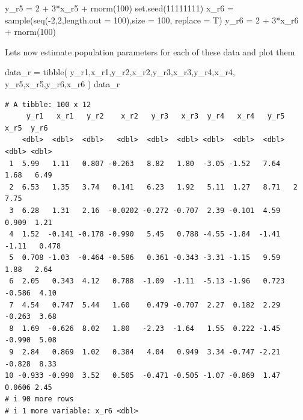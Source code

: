 \documentclass[
  letterpaper,
  DIV=11,
  numbers=noendperiod]{scrreprt}
\newenvironment{Shaded}{\begin{snugshade}}{\end{snugshade}}
\newcommand{\AttributeTok}[1]{\textcolor[rgb]{0.40,0.45,0.13}{#1}}
\newcommand{\DecValTok}[1]{\textcolor[rgb]{0.68,0.00,0.00}{#1}}
\newcommand{\FunctionTok}[1]{\textcolor[rgb]{0.28,0.35,0.67}{#1}}
\newcommand{\NormalTok}[1]{\textcolor[rgb]{0.00,0.23,0.31}{#1}}
\newcommand{\OtherTok}[1]{\textcolor[rgb]{0.00,0.23,0.31}{#1}}
\newcommand{\SpecialCharTok}[1]{\textcolor[rgb]{0.37,0.37,0.37}{#1}}
\begin{document}
\begin{Shaded}
\begin{Highlighting}[]
\NormalTok{y\_r5 }\OtherTok{=} \DecValTok{2} \SpecialCharTok{+} \DecValTok{3}\SpecialCharTok{*}\NormalTok{x\_r5 }\SpecialCharTok{+} \FunctionTok{rnorm}\NormalTok{(}\DecValTok{100}\NormalTok{)}
\FunctionTok{set.seed}\NormalTok{(}\DecValTok{11111111}\NormalTok{)}
\NormalTok{x\_r6 }\OtherTok{=} \FunctionTok{sample}\NormalTok{(}\FunctionTok{seq}\NormalTok{(}\SpecialCharTok{{-}}\DecValTok{2}\NormalTok{,}\DecValTok{2}\NormalTok{,}\AttributeTok{length.out =} \DecValTok{100}\NormalTok{),}\AttributeTok{size =} \DecValTok{100}\NormalTok{, }\AttributeTok{replace =}\NormalTok{ T)}
\NormalTok{y\_r6 }\OtherTok{=} \DecValTok{2} \SpecialCharTok{+} \DecValTok{3}\SpecialCharTok{*}\NormalTok{x\_r6 }\SpecialCharTok{+} \FunctionTok{rnorm}\NormalTok{(}\DecValTok{100}\NormalTok{)}
\end{Highlighting}
\end{Shaded}

Lets now estimate population parameters for each of these data and plot
them

\begin{Shaded}
\begin{Highlighting}[]
\NormalTok{data\_r }\OtherTok{=} \FunctionTok{tibble}\NormalTok{(}
\NormalTok{  y\_r1,x\_r1,y\_r2,x\_r2,y\_r3,x\_r3,y\_r4,x\_r4, y\_r5,x\_r5,y\_r6,x\_r6}
\NormalTok{)}
\NormalTok{data\_r}
\end{Highlighting}
\end{Shaded}

\begin{verbatim}
# A tibble: 100 x 12
     y_r1   x_r1   y_r2    x_r2   y_r3   x_r3  y_r4   x_r4   y_r5    x_r5  y_r6
    <dbl>  <dbl>  <dbl>   <dbl>  <dbl>  <dbl> <dbl>  <dbl>  <dbl>   <dbl> <dbl>
 1  5.99   1.11   0.807 -0.263   8.82   1.80  -3.05 -1.52   7.64   1.68   6.49 
 2  6.53   1.35   3.74   0.141   6.23   1.92   5.11  1.27   8.71   2      7.75 
 3  6.28   1.31   2.16  -0.0202 -0.272 -0.707  2.39 -0.101  4.59   0.909  1.21 
 4  1.52  -0.141 -0.178 -0.990   5.45   0.788 -4.55 -1.84  -1.41  -1.11   0.478
 5  0.708 -1.03  -0.464 -0.586   0.361 -0.343 -3.31 -1.15   9.59   1.88   2.64 
 6  2.05   0.343  4.12   0.788  -1.09  -1.11  -5.13 -1.96   0.723 -0.586  4.10 
 7  4.54   0.747  5.44   1.60    0.479 -0.707  2.27  0.182  2.29  -0.263  3.68 
 8  1.69  -0.626  8.02   1.80   -2.23  -1.64   1.55  0.222 -1.45  -0.990  5.08 
 9  2.84   0.869  1.02   0.384   4.04   0.949  3.34 -0.747 -2.21  -0.828  8.33 
10 -0.933 -0.990  3.52   0.505  -0.471 -0.505 -1.07 -0.869  1.47   0.0606 2.45 
# i 90 more rows
# i 1 more variable: x_r6 <dbl>
\end{verbatim}
\end{document}
